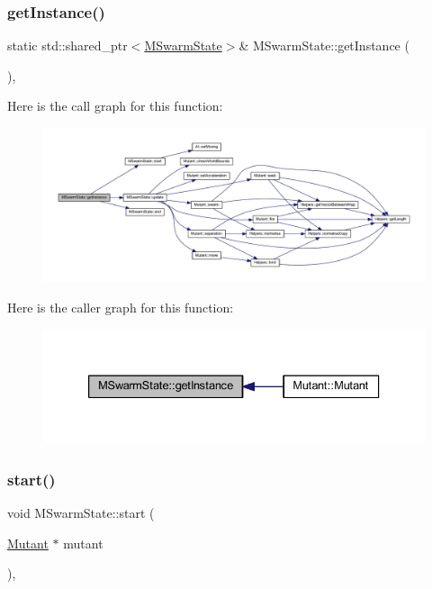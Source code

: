 \subsubsection{\texorpdfstring{get\+Instance()}{getInstance()}}
{\footnotesize\ttfamily static std\+::shared\+\_\+ptr$<$\hyperlink{class_m_swarm_state}{M\+Swarm\+State}$>$\& M\+Swarm\+State\+::get\+Instance (\begin{DoxyParamCaption}{ }\end{DoxyParamCaption})\hspace{0.3cm}{\ttfamily [inline]}, {\ttfamily [static]}}

Here is the call graph for this function\+:
\nopagebreak
\begin{figure}[H]
\begin{center}
\leavevmode
\includegraphics[width=350pt]{class_m_swarm_state_a34e48cde060647067f9990ee914b6dfd_cgraph}
\end{center}
\end{figure}
Here is the caller graph for this function\+:
\nopagebreak
\begin{figure}[H]
\begin{center}
\leavevmode
\includegraphics[width=333pt]{class_m_swarm_state_a34e48cde060647067f9990ee914b6dfd_icgraph}
\end{center}
\end{figure}
\mbox{\label{class_m_swarm_state_a16fbf13f8cb9436570eb97e829befc3e}} 
\subsubsection{\texorpdfstring{start()}{start()}}
{\footnotesize\ttfamily void M\+Swarm\+State\+::start (\begin{DoxyParamCaption}\item[{\hyperlink{class_mutant}{Mutant} $\ast$}]{mutant }\end{DoxyParamCaption})\hspace{0.3cm}{\ttfamily [override]}, {\ttfamily [virtual]}}



